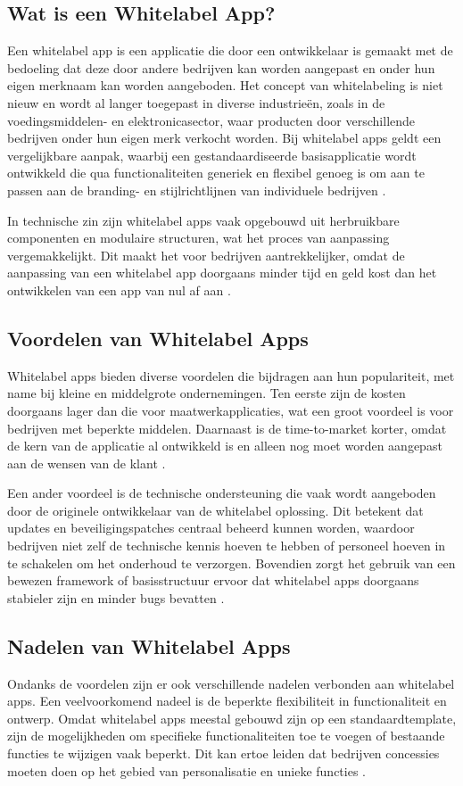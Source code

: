 \subsection{Wat is een Whitelabel App?}
Een whitelabel app is een applicatie die door een ontwikkelaar is gemaakt met de bedoeling dat deze door andere bedrijven kan worden aangepast en onder hun eigen merknaam kan worden aangeboden.
Het concept van whitelabeling is niet nieuw en wordt al langer toegepast in diverse industrieën, zoals in de voedingsmiddelen- en elektronicasector, waar producten door verschillende bedrijven onder hun eigen merk verkocht worden. 
Bij whitelabel apps geldt een vergelijkbare aanpak, waarbij een gestandaardiseerde basisapplicatie wordt ontwikkeld die qua functionaliteiten generiek en flexibel genoeg is om aan te passen aan de branding- en stijlrichtlijnen van individuele bedrijven \autocite{Candelario2024}.

In technische zin zijn whitelabel apps vaak opgebouwd uit herbruikbare componenten en modulaire structuren, wat het proces van aanpassing vergemakkelijkt. 
Dit maakt het voor bedrijven aantrekkelijker, omdat de aanpassing van een whitelabel app doorgaans minder tijd en geld kost dan het ontwikkelen van een app van nul af aan \autocite{Vendesta2019}.

\subsection{Voordelen van Whitelabel Apps}
Whitelabel apps bieden diverse voordelen die bijdragen aan hun populariteit, met name bij kleine en middelgrote ondernemingen. 
Ten eerste zijn de kosten doorgaans lager dan die voor maatwerkapplicaties, wat een groot voordeel is voor bedrijven met beperkte middelen. 
Daarnaast is de time-to-market korter, omdat de kern van de applicatie al ontwikkeld is en alleen nog moet worden aangepast aan de wensen van de klant \autocite{Struk2023}.

Een ander voordeel is de technische ondersteuning die vaak wordt aangeboden door de originele ontwikkelaar van de whitelabel oplossing. 
Dit betekent dat updates en beveiligingspatches centraal beheerd kunnen worden, waardoor bedrijven niet zelf de technische kennis hoeven te hebben of personeel hoeven in te schakelen om het onderhoud te verzorgen. 
Bovendien zorgt het gebruik van een bewezen framework of basisstructuur ervoor dat whitelabel apps doorgaans stabieler zijn en minder bugs bevatten \autocite{Candelario2024}.

\subsection{Nadelen van Whitelabel Apps}
Ondanks de voordelen zijn er ook verschillende nadelen verbonden aan whitelabel apps. 
Een veelvoorkomend nadeel is de beperkte flexibiliteit in functionaliteit en ontwerp. 
Omdat whitelabel apps meestal gebouwd zijn op een standaardtemplate, zijn de mogelijkheden om specifieke functionaliteiten toe te voegen of bestaande functies te wijzigen vaak beperkt. 
Dit kan ertoe leiden dat bedrijven concessies moeten doen op het gebied van personalisatie en unieke functies \autocite{Vendesta2023}.

